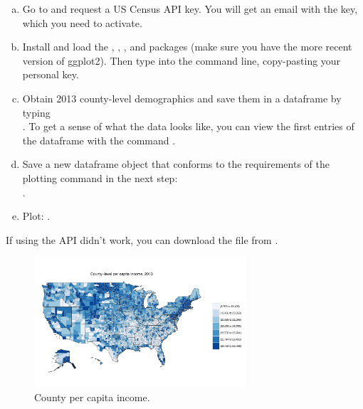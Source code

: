 \documentclass{beamer}
\begin{document}
\begin{frame}[allowframebreaks]
	\begin{myexc}
	\fontsize{9pt}{11}\selectfont
        \begin{enumerate}[(a)]
	        \item
	        Go to  and request a US Census API key. You will get an email with the key, which you need to activate.
	        \item
        	Install and load the , , , and  packages (make sure you have the more recent version of ggplot2). Then type  into the command line, copy-pasting your personal key.
        	\item
        	Obtain 2013 county-level demographics and save them in a dataframe by typing\\
        	. To get a sense of what the data looks like, you can view the first entries of the dataframe with the command .
        	\item
        	Save a new dataframe object that conforms to the requirements of the plotting command in the next step:\\
        	.
        	\item
        	Plot:
        	.
        \end{enumerate}
	\addtocounter{exccounter}{1}
	\end{myexc}
	
    If using the API didn't work, you can download the file  from \href{https://sites.google.com/site/reu2017vandijk/data}{}.
	
	\begin{figure}
	\centering
	\includegraphics[width=0.7\textwidth]{figures/R_plot_map}
	\caption{\scriptsize County per capita income.}
	\label{Fig: map}
	\end{figure}
	
\end{frame}
\end{document}
